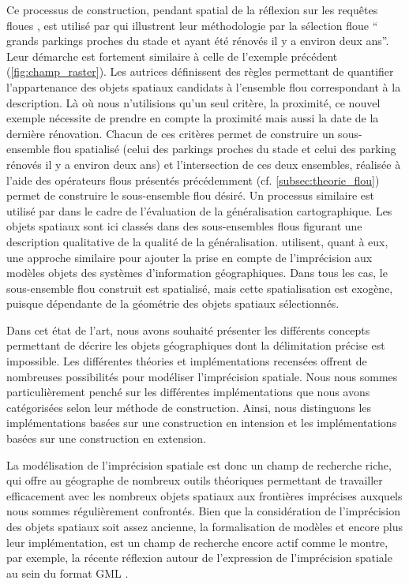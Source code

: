Ce processus de construction, pendant spatial de la réflexion sur les
requêtes floues \textcite{Wang1994,Moreau2018}, est utilisé par
\textcite{Duraciova2017} qui illustrent leur méthodologie par la
sélection floue \enquote{ grands parkings proches du
  stade et ayant été rénovés il y a environ deux ans}. Leur démarche
est fortement similaire à celle de l’exemple précédent
(\autoref{fig:champ_raster}). Les autrices définissent des règles
permettant de quantifier l’appartenance des objets spatiaux candidats
à l’ensemble flou correspondant à la description. Là où nous
n’utilisions qu’un seul critère, la proximité, ce nouvel exemple
nécessite de prendre en compte la proximité mais aussi la date de la
dernière rénovation. Chacun de ces critères permet de construire un
sous-ensemble flou spatialisé (celui des parkings proches du stade et
celui des parking rénovés il y a environ deux ans) et l’intersection
de ces deux ensembles, réalisée à l’aide des opérateurs flous
présentés précédemment (cf. \ref{subsec:theorie_flou}) permet de
construire le sous-ensemble flou désiré. Un processus similaire est
utilisé par \textcite{Bard2003} dans le cadre de l’évaluation de la
généralisation cartographique. Les objets spatiaux sont ici classés
dans des sous-ensembles flous figurant une description qualitative de
la qualité de la généralisation. \textcite{Cross2000} utilisent, quant
à eux, une approche similaire pour ajouter la prise en compte de
l’imprécision aux modèles objets des systèmes d’information
géographiques. Dans tous les cas, le sous-ensemble flou construit est
spatialisé, mais cette spatialisation est exogène, puisque dépendante
de la géométrie des objets spatiaux sélectionnés.


Dans cet état de l’art, nous avons souhaité présenter les différents
concepts permettant de décrire les objets géographiques dont la
délimitation précise est impossible. Les différentes théories et
implémentations recensées offrent de nombreuses possibilités pour
modéliser l’imprécision spatiale. Nous nous sommes particulièrement
penché sur les différentes implémentations que nous avons catégorisées
selon leur méthode de construction. Ainsi, nous distinguons les
implémentations basées sur une construction en intension et les
implémentations basées sur une construction en extension.

La modélisation de l’imprécision spatiale est donc un champ de
recherche riche, qui offre au géographe de nombreux outils théoriques
permettant de travailler efficacement avec les nombreux objets
spatiaux aux frontières imprécises auxquels nous sommes régulièrement
confrontés. Bien que la considération de l’imprécision des objets
spatiaux soit assez ancienne, la formalisation de modèles et encore
plus leur implémentation, est un champ de recherche encore actif comme
le montre, par exemple, la récente réflexion autour de l’expression de
l’imprécision spatiale au sein du format GML \autocite{Wei2017}.



